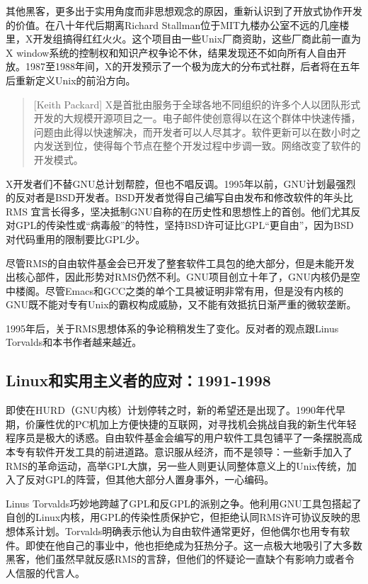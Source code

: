 \documentclass[12pt,oneside]{book}
\begin{document}
\begin{common-format}
其他黑客，更多出于实用角度而非思想观念的原因，重新认识到了开放式协作开发的价值。在八十年代后期离Richard Stallman位于MIT九楼办公室不远的几座楼里，X开发组搞得红红火火。这个项目由一些Unix厂商资助，这些厂商此前一直为X window系统的控制权和知识产权争论不休，结果发现还不如向所有人自由开放。1987至1988年间，X的开发预示了一个极为庞大的分布式社群，后者将在五年后重新定义Unix的前沿方向。

\begin{quote}[Keith Packard]
X是首批由服务于全球各地不同组织的许多个人以团队形式开发的大规模开源项目之一。电子邮件使创意得以在这个群体中快速传播，问题由此得以快速解决，而开发者可以人尽其才。软件更新可以在数小时之内发送到位，使得每个节点在整个开发过程中步调一致。网络改变了软件的开发模式。
\end{quote}

X开发者们不替GNU总计划帮腔，但也不唱反调。1995年以前，GNU计划最强烈的反对者是BSD开发者。BSD开发者觉得自己编写自由发布和修改软件的年头比RMS
宜言长得多，坚决抵制GNU自称的在历史性和思想性上的首创。他们尤其反对GPL的传染性或“病毒般”的特性，坚持BSD许可证比GPL“更自由”，因为BSD对代码重用的限制要比GPL少。

尽管RMS的自由软件基金会已开发了整套软件工具包的绝大部分，但是未能开发出核心部件，因此形势对RMS仍然不利。GNU项目创立十年了，GNU内核仍是空中楼阁。尽管Emacs和GCC之类的单个工具被证明非常有用，但是没有内核的GNU既不能对专有Unix的霸权构成威胁，又不能有效抵抗日渐严重的微软垄断。

1995年后，关于RMS思想体系的争论稍稍发生了变化。反对者的观点跟Linus Torvalds和本书作者越来越近。


\subsection{Linux和实用主义者的应对：1991-1998}
即使在HURD（GNU内核）计划停转之时，新的希望还是出现了。1990年代早期，价廉性优的PC机加上方便快捷的互联网，对寻找机会挑战自我的新生代年轻程序员是极大的诱惑。自由软件基金会编写的用户软件工具包铺平了一条摆脱高成本专有软件开发工具的前进道路。意识服从经济，而不是领导：一些新手加入了RMS的革命运动，高举GPL大旗，另一些人则更认同整体意义上的Unix传统，加入了反对GPL的阵营，但其他大部分人置身事外，一心编码。

Linus Torvalds巧妙地跨越了GPL和反GPL的派别之争。他利用GNU工具包搭起了自创的Linux内核，用GPL的传染性质保护它，但拒绝认同RMS许可协议反映的思
想体系计划。Torvalds明确表示他认为自由软件通常更好，但他偶尔也用专有软件。即使在他自己的事业中，他也拒绝成为狂热分子。这一点极大地吸引了大多数黑客，他们虽然早就反感RMS的言辞，但他们的怀疑论一直缺个有影响力或者令人信服的代言人。


\end{common-format}
\end{document}
